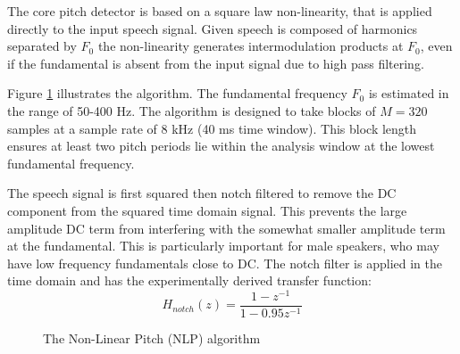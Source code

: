 \documentclass{article}
\begin{document}
{The core pitch detector is based on a square law non-linearity, that is applied directly to the input speech signal. Given speech is composed of harmonics separated by $F_0$ the non-linearity generates intermodulation products at $F_0$, even if the fundamental is absent from the input signal due to high pass filtering.

Figure \ref{fig:nlp} illustrates the algorithm. The fundamental frequency $F_0$ is estimated in the range of 50-400 Hz. The algorithm is designed to take blocks of $M = 320$ samples at a sample rate of 8 kHz (40 ms time window). This block length ensures at least two pitch periods lie within the analysis window at the lowest fundamental frequency.

The speech signal is first squared then notch filtered to remove the DC component from the squared time domain signal. This prevents the large amplitude DC term from interfering with the somewhat smaller amplitude term at the fundamental. This is particularly important for male speakers, who may have low frequency fundamentals close to DC. The notch filter is applied in the time domain and has the experimentally derived transfer function:
\begin{equation}
H_{notch}(z) = \frac{1-z^{-1}}{1-0.95z^{-1}}
\end{equation}

\begin{figure}[h]
\caption{The Non-Linear Pitch (NLP) algorithm}
\label{fig:nlp}
\begin{center}
\end{center}
\end{figure}}
\end{document}
